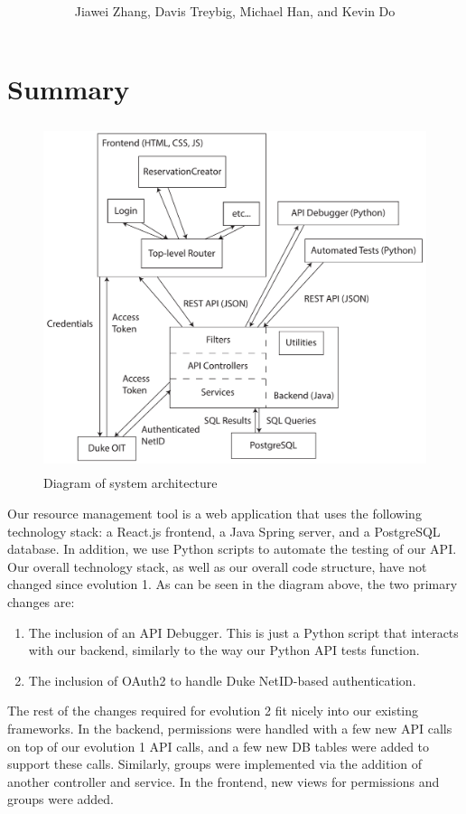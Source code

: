 \documentclass[12pt]{article}
\title{\horrule{5pt}\\\vspace{0.4cm}{\bf \mytitle}\\}
\author{Jiawei Zhang, Davis Treybig, Michael Han, and Kevin Do}
\date{\horrule{1pt}}
\begin{document}
\maketitle{}
\section{Summary}
\begin{figure}[h]
\begin{center}
\includegraphics[height=4in]{ev2_design_cropped.pdf}
\end{center}
\caption{Diagram of system architecture}
\label{fig:design}
\end{figure}

Our resource management tool is a web application that uses the following technology stack: a React.js frontend, a Java Spring server, and a PostgreSQL database. In addition, we use Python scripts to automate the testing of our API. Our overall technology stack, as well as our overall code structure, have not changed since evolution 1. As can be seen in the diagram above, the two primary changes are:
\begin{enumerate}
    \item The inclusion of an API Debugger. This is just a Python script that interacts with our backend, similarly to the way our Python API tests function. 
    \item The inclusion of OAuth2 to handle Duke NetID-based authentication.
\end{enumerate}

The rest of the changes required for evolution 2 fit nicely into our existing frameworks. In the backend, permissions were handled with a few new API calls on top of our evolution 1 API calls, and a few new DB tables were added to support these calls. Similarly, groups were implemented via the addition of another controller and service. In the frontend, new views for permissions and groups were added.  
\end{document}

